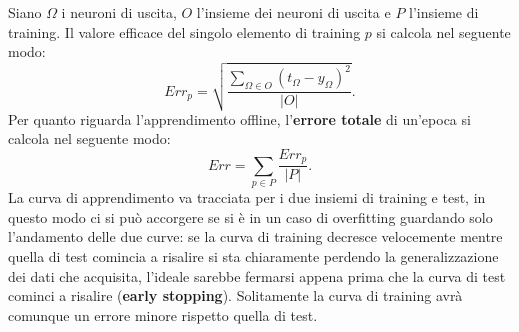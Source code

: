 \documentclass[12pt, twoside, letterpaper]{report}
\begin{document}
				Siano $\Omega$ i neuroni di uscita, $O$ l'insieme dei neuroni di uscita e $P$ l'insieme di training. Il valore efficace del singolo elemento di training $p$ si calcola nel seguente modo: $$Err_p = \sqrt{\frac{\sum_{\Omega \in O} (t_{\Omega} - y_{\Omega})^2}{|O|}}.$$
				Per quanto riguarda l'apprendimento offline, l'\textbf{errore totale} di un'epoca si calcola nel seguente modo: $$Err = \sum_{p \in P} \frac{Err_p}{|P|}.$$ 
				La curva di apprendimento va tracciata per i due insiemi di training e test, in questo modo ci si può accorgere se si è in un caso di overfitting guardando solo l'andamento delle due curve: se la curva di training decresce velocemente mentre quella di test comincia a risalire si sta chiaramente perdendo la generalizzazione dei dati che acquisita, l'ideale sarebbe fermarsi appena prima che la curva di test cominci a risalire (\textbf{early stopping}). Solitamente la curva di training avrà comunque un errore minore rispetto quella di test.
\end{document}
